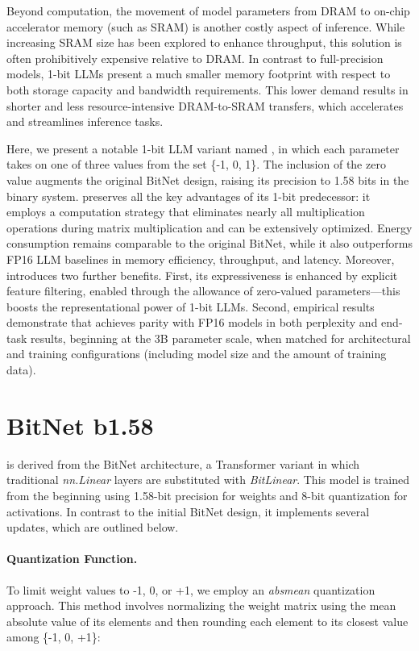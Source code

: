 Beyond computation, the movement of model parameters from DRAM to on-chip accelerator memory (such as SRAM) is another costly aspect of inference. While increasing SRAM size has been explored to enhance throughput, this solution is often prohibitively expensive relative to DRAM. In contrast to full-precision models, 1-bit LLMs present a much smaller memory footprint with respect to both storage capacity and bandwidth requirements. This lower demand results in shorter and less resource-intensive DRAM-to-SRAM transfers, which accelerates and streamlines inference tasks.

Here, we present a notable 1-bit LLM variant named \textbf{}, in which each parameter takes on one of three values from the set \{-1, 0, 1\}. The inclusion of the zero value augments the original BitNet design, raising its precision to 1.58 bits in the binary system.  preserves all the key advantages of its 1-bit predecessor: it employs a computation strategy that eliminates nearly all multiplication operations during matrix multiplication and can be extensively optimized. Energy consumption remains comparable to the original BitNet, while it also outperforms FP16 LLM baselines in memory efficiency, throughput, and latency. Moreover,  introduces two further benefits. First, its expressiveness is enhanced by explicit feature filtering, enabled through the allowance of zero-valued parameters—this boosts the representational power of 1-bit LLMs. Second, empirical results demonstrate that  achieves parity with FP16 models in both perplexity and end-task results, beginning at the 3B parameter scale, when matched for architectural and training configurations (including model size and the amount of training data).

\section{BitNet b1.58}

 is derived from the BitNet architecture, a Transformer variant in which traditional \emph{nn.Linear} layers are substituted with \emph{BitLinear}. This model is trained from the beginning using 1.58-bit precision for weights and 8-bit quantization for activations. In contrast to the initial BitNet design, it implements several updates, which are outlined below.

\paragraph{Quantization Function.} To limit weight values to -1, 0, or +1, we employ an \emph{absmean} quantization approach. This method involves normalizing the weight matrix using the mean absolute value of its elements and then rounding each element to its closest value among \{-1, 0, +1\}:

